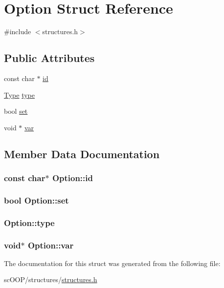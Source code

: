 \hypertarget{struct_option}{\section{Option Struct Reference}
\label{struct_option}
}


{\ttfamily \#include $<$structures.\+h$>$}

\subsection*{Public Attributes}
\begin{DoxyCompactItemize}
\item 
const char $\ast$ \hyperlink{struct_option_a079b5c513dd5ced15d838d07d399647f}{id}
\item 
\hyperlink{structures_8h_a1d1cfd8ffb84e947f82999c682b666a7}{Type} \hyperlink{struct_option_ad15b654fba85483e1d7bad63b0b5baea}{type}
\item 
bool \hyperlink{struct_option_a999dc5921afb2351d465621142270d39}{set}
\item 
void $\ast$ \hyperlink{struct_option_ad655d8238c0f6559f9cd2afc1e2ddc9d}{var}
\end{DoxyCompactItemize}


\subsection{Member Data Documentation}
\hypertarget{struct_option_a079b5c513dd5ced15d838d07d399647f}{
\subsubsection[{id}]{\setlength{\rightskip}{0pt plus 5cm}const char$\ast$ Option\+::id}}\label{struct_option_a079b5c513dd5ced15d838d07d399647f}
\hypertarget{struct_option_a999dc5921afb2351d465621142270d39}{
\subsubsection[{set}]{\setlength{\rightskip}{0pt plus 5cm}bool Option\+::set}}\label{struct_option_a999dc5921afb2351d465621142270d39}
\hypertarget{struct_option_ad15b654fba85483e1d7bad63b0b5baea}{
\subsubsection[{type}]{ Option\+::type}}\label{struct_option_ad15b654fba85483e1d7bad63b0b5baea}
\hypertarget{struct_option_ad655d8238c0f6559f9cd2afc1e2ddc9d}{
\subsubsection[{var}]{\setlength{\rightskip}{0pt plus 5cm}void$\ast$ Option\+::var}}\label{struct_option_ad655d8238c0f6559f9cd2afc1e2ddc9d}


The documentation for this struct was generated from the following file\+:\begin{DoxyCompactItemize}
\item 
sc\+O\+O\+P/structures/\hyperlink{structures_8h}{structures.\+h}\end{DoxyCompactItemize}
